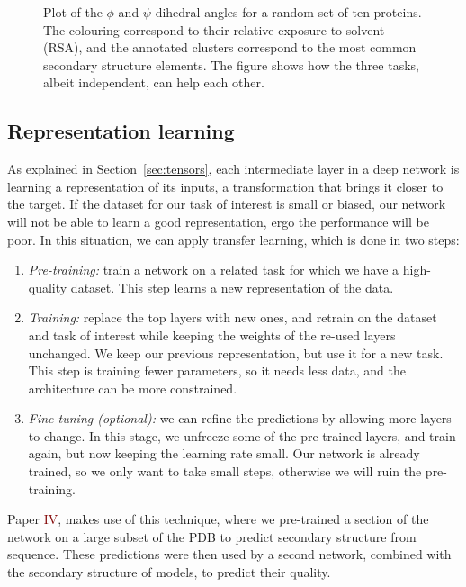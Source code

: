\begin{figure}[bht]
\centering
\caption{Plot of the $\phi$ and $\psi$ dihedral angles for a random set of ten proteins.
The colouring correspond to their relative exposure to solvent (RSA), 
and the annotated clusters correspond to the most common secondary structure elements.
The figure shows how the three tasks, albeit independent, can help each other. }\label{fig:transfer_learning}
\end{figure}

\subsection{Representation learning}
As explained in Section~\ref{sec:tensors}, each intermediate layer in a deep network is learning a representation of its inputs, a transformation that brings it closer to the target.
If the dataset for our task of interest is small or biased, our network will not be able to learn a good representation, ergo the performance will be poor.
In this situation, we can apply transfer learning, which is done in two steps:
\begin{enumerate}
\item \emph{Pre-training:} train a network on a related task for which we have a high-quality dataset.
This step learns a new representation of the data.
\item \emph{Training:} replace the top layers with new ones, and retrain on the dataset and task of interest while keeping the weights of the re-used layers unchanged.
We keep our previous representation, but use it for a new task.
This step is training fewer parameters, so it needs less data, and the architecture can be more constrained.
\item \emph{Fine-tuning (optional):} we can refine the predictions by allowing more layers to change.
In this stage, we unfreeze some of the pre-trained layers, and train again, but now keeping the learning rate small.
Our network is already trained, so we only want to take small steps, otherwise we will ruin the pre-training.
\end{enumerate}

Paper \textcolor{Maroon}{IV}, makes use of this technique, where we pre-trained a section of the network on a large subset of the PDB to predict secondary structure from sequence.
These predictions were then used by a second network, combined with the secondary structure of models, to predict their quality.

